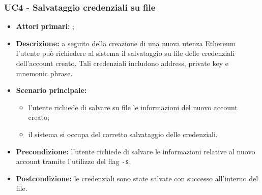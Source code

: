 \subsubsection{UC4 - Salvataggio credenziali su file}
\begin{itemize}
	\item \textbf{Attori primari:} \una{};
	\item \textbf{Descrizione:} a seguito della creazione di una nuova utenza Ethereum l’utente può richiedere al sistema il salvataggio su file delle credenziali dell’account creato. Tali credenziali includono address, private key e mnemonic phrase.
	\item \textbf{Scenario principale:}
	\begin{itemize}
		\item l’utente richiede di salvare su file le informazioni del nuovo account creato; 
		\item il sistema si occupa del corretto salvataggio delle credenziali. 
	\end{itemize}
	\item \textbf{Precondizione:} l’utente richiede di salvare le informazioni relative al nuovo account tramite l’utilizzo del flag \texttt{-s};  
	\item \textbf{Postcondizione:} le credenziali sono state salvate con successo all’interno del file.  
\end{itemize}